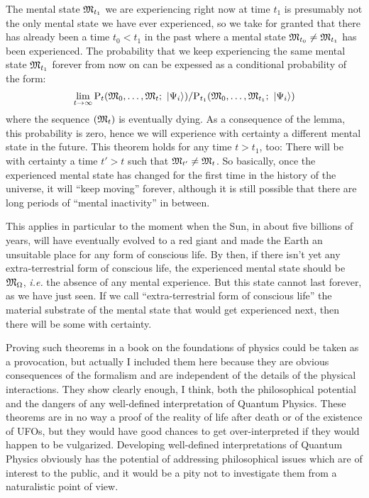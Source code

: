  The mental state $\mathfrak{M}_{t_1}$ we are experiencing right now at time $t_1$ is presumably not the only mental state we have ever experienced, so we take for granted that there has already been a time $t_0 < t_1$ in the past where a mental state $\mathfrak{M}_{t_0} \neq \mathfrak{M}_{t_1}$ has been experienced. The probability that we keep experiencing the same mental state $\mathfrak{M}_{t_1}$ forever from now on can be expessed as a conditional probability of the form:
\begin{equation*}
\lim_{t \to \infty} \mathrm P_t(\mathfrak{M}_0, \dotsc, \mathfrak{M}_t; \ \left|{\Psi_i}\right\rangle) / \mathrm P_{t_1}(\mathfrak{M}_0, \dotsc, \mathfrak{M}_{t_1}; \ \left|{\Psi_i}\right\rangle)
\end{equation*}
where the sequence $(\mathfrak{M}_t)$ is eventually dying. As a consequence of the lemma, this probability is zero, hence we will experience with certainty a different mental state in the future. This theorem holds for any time $t > t_1$, too: There will be with certainty a time $t' > t$ such that $\mathfrak{M}_{t'} \neq \mathfrak{M}_t$. So basically, once the experienced mental state has changed for the first time in the history of the universe, it will ``keep moving'' forever, although it is still possible that there are long periods of ``mental inactivity'' in between.

This applies in particular to the moment when the Sun, in about five billions of years, will have eventually evolved to a red giant and made the Earth an unsuitable place for any form of conscious life. By then, if there isn't yet any extra-terrestrial form of conscious life, the experienced mental state should be $\mathfrak{M}_\Omega$, \textit{i.e.} the absence of any mental experience. But this state cannot last forever, as we have just seen. If we call ``extra-terrestrial form of conscious life'' the material substrate of the mental state that would get experienced next, then there will be some with certainty.

 Proving such theorems in a book on the foundations of physics could be taken as a provocation, but actually I included them here because they are obvious consequences of the formalism and are independent of the details of the physical interactions. They show clearly enough, I think, both the philosophical potential and the dangers of any well-defined interpretation of Quantum Physics. These theorems are in no way a proof of the reality of life after death or of the existence of UFOs, but they would have good chances to get over-interpreted if they would happen to be vulgarized. Developing well-defined interpretations of Quantum Physics obviously has the potential of addressing philosophical issues which are of interest to the public, and it would be a pity not to investigate them from a naturalistic point of view.

